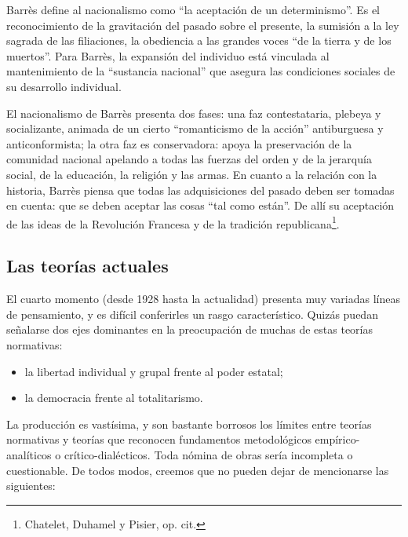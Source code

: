 \documentclass[
]{book}
\providecommand{\tightlist}{%
  \setlength{\itemsep}{0pt}\setlength{\parskip}{0pt}}
\begin{document}
Barrès define al nacionalismo como ``la aceptación de un determinismo''. Es el reconocimiento de la gravitación del pasado sobre el presente, la sumisión a la ley sagrada de las filiaciones, la obediencia a las grandes voces ``de la tierra y de los muertos''. Para Barrès, la expansión del individuo está vinculada al mantenimiento de la ``sustancia nacional'' que asegura las condiciones sociales de su desarrollo individual.

El nacionalismo de Barrès presenta dos fases: una faz contestataria, plebeya y socializante, animada de un cierto ``romanticismo de la acción'' antiburguesa y anticonformista; la otra faz es conservadora: apoya la preservación de la comunidad nacional apelando a todas las fuerzas del orden y de la jerarquía social, de la educación, la religión y las armas. En cuanto a la relación con la historia, Barrès piensa que todas las adquisiciones del pasado deben ser tomadas en cuenta: que se deben aceptar las cosas ``tal como están''. De allí su aceptación de las ideas de la Revolución Francesa y de la tradición republicana\footnote{Chatelet, Duhamel y Pisier, op. cit.}.

\hypertarget{las-teoruxedas-actuales}{%
\subsection*{Las teorías actuales}\label{las-teoruxedas-actuales}}

El cuarto momento (desde 1928 hasta la actualidad) presenta muy variadas líneas de pensamiento, y es difícil conferirles un rasgo característico. Quizás puedan señalarse dos ejes dominantes en la preocupación de muchas de estas teorías normativas:

\begin{itemize}
\tightlist
\item
  la libertad individual y grupal frente al poder estatal;
\item
  la democracia frente al totalitarismo.
\end{itemize}

La producción es vastísima, y son bastante borrosos los límites entre teorías normativas y teorías que reconocen fundamentos metodológicos empírico-analíticos o crítico-dialécticos. Toda nómina de obras sería incompleta o cuestionable. De todos modos, creemos que no pueden dejar de mencionarse las siguientes:
\end{document}

